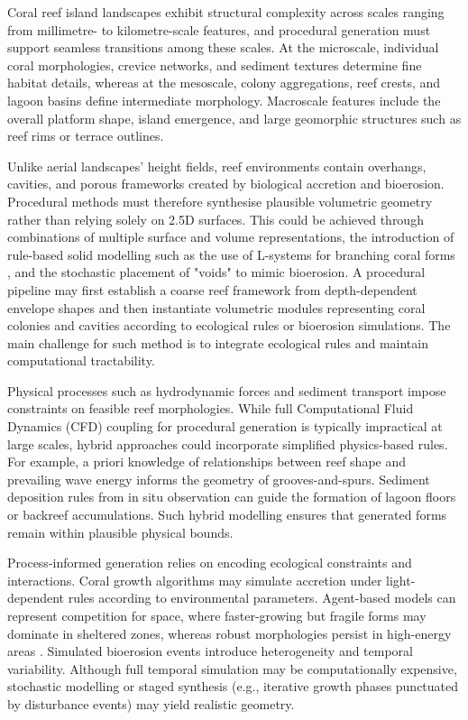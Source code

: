 Coral reef island landscapes exhibit structural complexity across scales ranging from millimetre- to kilometre-scale features, and procedural generation must support seamless transitions among these scales. At the microscale, individual coral morphologies, crevice networks, and sediment textures determine fine habitat details, whereas at the mesoscale, colony aggregations, reef crests, and lagoon basins define intermediate morphology. Macroscale features include the overall platform shape, island emergence, and large geomorphic structures such as reef rims or terrace outlines.

Unlike aerial landscapes' height fields, reef environments contain overhangs, cavities, and porous frameworks created by biological accretion and bioerosion. Procedural methods must therefore synthesise plausible volumetric geometry rather than relying solely on 2.5D surfaces. This could be achieved through combinations of multiple surface and volume representations, the introduction of rule-based solid modelling such as the use of L-systems for branching coral forms \cite{Prusinkiewicz1992, Abela2015}, and the stochastic placement of "voids" to mimic bioerosion. A procedural pipeline may first establish a coarse reef framework from depth-dependent envelope shapes and then instantiate volumetric modules representing coral colonies and cavities according to ecological rules or bioerosion simulations. The main challenge for such method is to integrate ecological rules and maintain computational tractability.

Physical processes such as hydrodynamic forces and sediment transport impose constraints on feasible reef morphologies. While full Computational Fluid Dynamics (CFD) coupling for procedural generation is typically impractical at large scales, hybrid approaches could incorporate simplified physics-based rules. For example, a priori knowledge of relationships between reef shape and prevailing wave energy informs the geometry of grooves-and-spurs. Sediment deposition rules from in situ observation can guide the formation of lagoon floors or backreef accumulations. Such hybrid modelling ensures that generated forms remain within plausible physical bounds.

Process-informed generation relies on encoding ecological constraints and interactions. Coral growth algorithms may simulate accretion under light-dependent rules according to environmental parameters. Agent-based models can represent competition for space, where faster-growing but fragile forms may dominate in sheltered zones, whereas robust morphologies persist in high-energy areas \cite{Anthony2000}. Simulated bioerosion events introduce heterogeneity and temporal variability. Although full temporal simulation may be computationally expensive, stochastic modelling or staged synthesis (e.g., iterative growth phases punctuated by disturbance events) may yield realistic geometry.

